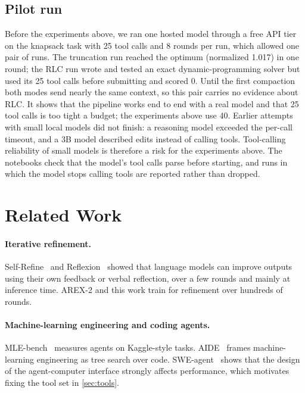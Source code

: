\documentclass[11pt]{article}
\begin{document}
\subsection{Pilot run}
\label{sec:pilot}
Before the experiments above, we ran one hosted model through a free API tier on the knapsack task with 25 tool calls and 8 rounds per run, which allowed one pair of runs. The truncation run reached the optimum (normalized 1.017) in one round; the RLC run wrote and tested an exact dynamic-programming solver but used its 25 tool calls before submitting and scored 0. Until the first compaction both modes send nearly the same context, so this pair carries no evidence about RLC. It shows that the pipeline works end to end with a real model and that 25 tool calls is too tight a budget; the experiments above use 40. Earlier attempts with small local models did not finish: a reasoning model exceeded the per-call timeout, and a 3B model described edits instead of calling tools. Tool-calling reliability of small models is therefore a risk for the experiments above. The notebooks check that the model's tool calls parse before starting, and runs in which the model stops calling tools are reported rather than dropped.

\section{Related Work}
\label{sec:related}

\paragraph{Iterative refinement.}
Self-Refine~\citep{madaan2023selfrefine} and Reflexion~\citep{shinn2023reflexion} showed that language models can improve outputs using their own feedback or verbal reflection, over a few rounds and mainly at inference time. AREX-2 and this work train for refinement over hundreds of rounds.

\paragraph{Machine-learning engineering and coding agents.}
MLE-bench~\citep{chan2025mlebench} measures agents on Kaggle-style tasks. AIDE~\citep{jiang2025aide} frames machine-learning engineering as tree search over code. SWE-agent~\citep{yang2024sweagent} shows that the design of the agent-computer interface strongly affects performance, which motivates fixing the tool set in \cref{sec:tools}.
\end{document}
